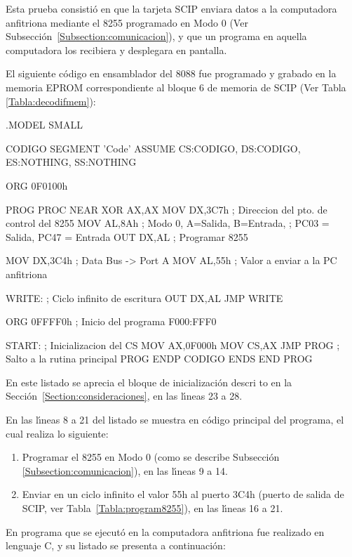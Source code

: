 Esta prueba consisti\'o en que la tarjeta SCIP enviara datos a la computadora anfitriona %
mediante el 8255 programado en Modo 0 (Ver Subsecci\'on~\ref{Subsection:comunicacion}), y que %
un programa en aquella computadora los recibiera y desplegara en pantalla.

El siguiente c\'odigo en ensamblador del 8088 fue programado y grabado en la memoria EPROM %
correspondiente al bloque 6 de memoria de SCIP (Ver Tabla \ref{Tabla:decodifmem}):

\begin{listing}{1}
.MODEL SMALL

CODIGO SEGMENT 'Code'
   ASSUME CS:CODIGO, DS:CODIGO, ES:NOTHING, SS:NOTHING

   ORG 0F0100h

PROG PROC NEAR    
   XOR AX,AX
   MOV DX,3C7h    ; Direccion del pto. de control del 8255
   MOV AL,8Ah     ; Modo 0, A=Salida, B=Entrada, 
                  ; PC03 = Salida, PC47 = Entrada
   OUT DX,AL      ; Programar 8255 

   MOV DX,3C4h    ; Data Bus -> Port A
   MOV AL,55h     ; Valor a enviar a la PC anfitriona
   
 WRITE:           ; Ciclo infinito de escritura
   OUT DX,AL     
   JMP WRITE
   
   ORG 0FFFF0h    ; Inicio del programa F000:FFF0

 START:           ; Inicializacion del CS
   MOV AX,0F000h  
   MOV CS,AX
   JMP PROG       ; Salto a la rutina principal
PROG ENDP
CODIGO ENDS
   END PROG
\end{listing}

En es\-te lis\-ta\-do se a\-pre\-cia el blo\-que de ini\-cia\-li\-za\-ci\-\'on des\-cri\-%
to en la Secci\'on~\ref{Section:consideraciones}, en las l\'{\i}neas 23 a 28.

En las l\'{\i}neas 8 a 21 del listado se muestra en c\'odigo principal del programa, el cual %
realiza lo siguiente:

\begin{enumerate}
\item Programar el 8255 en Modo 0 (como se describe Subsecci\'on %
\ref{Subsection:comunicacion}), en las l\'{\i}neas 9 a 14.
\item Enviar en un ciclo infinito el valor 55h al puerto 3C4h (puerto de salida de SCIP, ver %
Tabla~\ref{Tabla:program8255}), en las l\'{\i}neas 16 a 21.
\end{enumerate}

En programa que se ejecut\'o en la computadora anfitriona fue realizado en lenguaje C, y su %
listado se presenta a continuaci\'on:

